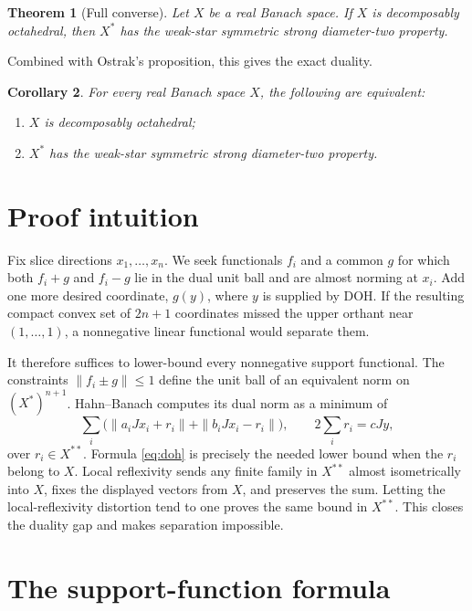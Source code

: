 \documentclass[11pt]{article}
\newtheorem{theorem}{Theorem}
\newtheorem{corollary}[theorem]{Corollary}
\newcommand{\J}{J}
\newcommand{\DOH}{\mathrm{DOH}}
\begin{document}
\begin{theorem}[Full converse]\label{thm:main}
Let $X$ be a real Banach space.  If $X$ is decomposably octahedral, then
$X^*$ has the weak-star symmetric strong diameter-two property.
\end{theorem}

Combined with Ostrak's proposition, this gives the exact duality.

\begin{corollary}\label{cor:equivalence}
For every real Banach space $X$, the following are equivalent:
\begin{enumerate}[label=\textup{(\roman*)}]
\item $X$ is decomposably octahedral;
\item $X^*$ has the weak-star symmetric strong diameter-two property.
\end{enumerate}
\end{corollary}

\section{Proof intuition}

Fix slice directions $x_1,\ldots,x_n$.  We seek functionals $f_i$ and a
common $g$ for which both $f_i+g$ and $f_i-g$ lie in the dual unit ball and
are almost norming at $x_i$.  Add one more desired coordinate, $g(y)$,
where $y$ is supplied by $\DOH$.  If the resulting compact convex set of
$2n+1$ coordinates missed the upper orthant near $(1,\ldots,1)$, a
nonnegative linear functional would separate them.

It therefore suffices to lower-bound every nonnegative support functional.
The constraints $\|f_i\pm g\|\le1$ define the unit ball of an equivalent
norm on $(X^*)^{n+1}$.  Hahn--Banach computes its dual norm as a minimum of
\[
 \sum_i\bigl(\|a_i\J x_i+r_i\|+
                    \|b_i\J x_i-r_i\|\bigr),
 \qquad 2\sum_i r_i=c\J y,
\]
over $r_i\in X^{**}$.  Formula \eqref{eq:doh} is precisely the needed
lower bound when the $r_i$ belong to $X$.  Local reflexivity sends any
finite family in $X^{**}$ almost isometrically into $X$, fixes the displayed
vectors from $X$, and preserves the sum.  Letting the local-reflexivity
distortion tend to one proves the same bound in $X^{**}$.  This closes the
duality gap and makes separation impossible.

\section{The support-function formula}
\end{document}
